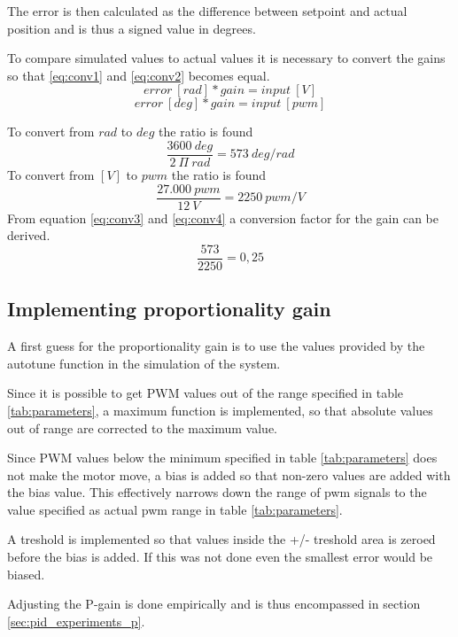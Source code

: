 The error is then calculated as the difference between setpoint and actual position and is thus a signed value in degrees.

To compare simulated values to actual values it is necessary to convert the gains so that \ref{eq:conv1} and \ref{eq:conv2} becomes equal. 
\begin{equation}
error \ [rad] * gain = input \ [V]
\label{eq:conv1}
\end{equation}
\begin{equation}
error \ [deg] * gain = input \ [pwm]
\label{eq:conv2}
\end{equation}

To convert from $rad$ to $deg$ the ratio is found
\begin{equation}
\frac{3600 \ deg}{2 \ \Pi \ rad} = 573 \ deg/rad
\label{eq:conv3}
\end{equation}
To convert from $[V]$ to $pwm$ the ratio is found
\begin{equation}
\frac{27.000 \ pwm}{12 \ V} = 2250 \ pwm/V
\label{eq:conv4}
\end{equation}
From equation \ref{eq:conv3} and \ref{eq:conv4} a conversion factor for the gain can be derived.
\begin{equation}
\frac{573}{2250} = 0,25
\label{eq:conv}
\end{equation}

\subsection{Implementing proportionality gain}
A first guess for the proportionality gain is to use the values provided by the autotune function in the simulation of the system. 

Since it is possible to get PWM values out of the range specified in table \ref{tab:parameters}, a maximum function is implemented, so that absolute values out of range are corrected to the maximum value.

Since PWM values below the minimum specified in table \ref{tab:parameters} does not make the motor move, a bias is added so that non-zero values are added with the bias value. This effectively narrows down the range of pwm signals to the value specified as actual pwm range in table \ref{tab:parameters}. 

A treshold is implemented so that values inside the +/- treshold area is zeroed before the bias is added. If this was not done even the smallest error would be biased.

Adjusting the P-gain is done empirically and is thus encompassed in section \ref{sec:pid_experiments_p}.

